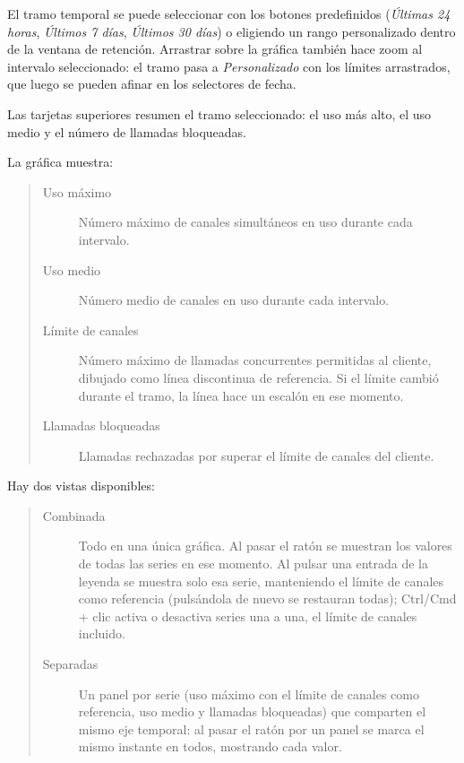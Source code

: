 \documentclass[letterpaper,10pt,spanish]{sphinxmanual}
\begin{document}
El tramo temporal se puede seleccionar con los botones predefinidos (\emph{Últimas 24 horas}, \emph{Últimos 7 días}, \emph{Últimos 30 días}) o eligiendo un rango personalizado dentro de la ventana de retención. Arrastrar sobre la gráfica también hace zoom al intervalo seleccionado: el tramo pasa a \emph{Personalizado} con los límites arrastrados, que luego se pueden afinar en los selectores de fecha.

Las tarjetas superiores resumen el tramo seleccionado: el uso más alto, el uso medio y el número de llamadas bloqueadas.

La gráfica muestra:
\begin{quote}
\begin{description}
\item[{Uso máximo}] \leavevmode
Número máximo de canales simultáneos en uso durante cada intervalo.

\item[{Uso medio}] \leavevmode
Número medio de canales en uso durante cada intervalo.

\item[{Límite de canales}] \leavevmode
Número máximo de llamadas concurrentes permitidas al cliente, dibujado como línea discontinua de referencia. Si el límite cambió durante el tramo, la línea hace un escalón en ese momento.

\item[{Llamadas bloqueadas}] \leavevmode
Llamadas rechazadas por superar el límite de canales del cliente.

\end{description}
\end{quote}

Hay dos vistas disponibles:
\begin{quote}
\begin{description}
\item[{Combinada}] \leavevmode
Todo en una única gráfica. Al pasar el ratón se muestran los valores de todas las series en ese momento. Al pulsar una entrada de la leyenda se muestra solo esa serie, manteniendo el límite de canales como referencia (pulsándola de nuevo se restauran todas); Ctrl/Cmd + clic activa o desactiva series una a una, el límite de canales incluido.

\item[{Separadas}] \leavevmode
Un panel por serie (uso máximo con el límite de canales como referencia, uso medio y llamadas bloqueadas) que comparten el mismo eje temporal: al pasar el ratón por un panel se marca el mismo instante en todos, mostrando cada valor.

\end{description}
\end{quote}
\end{document}

